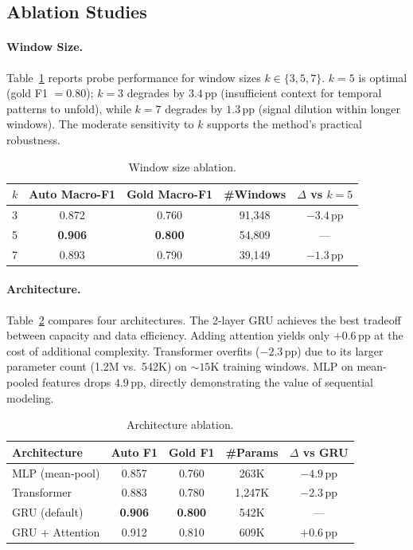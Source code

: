 \documentclass[11pt]{article}
\begin{document}
\subsection{Ablation Studies}
\label{sec:ablations}

\paragraph{Window Size.}
Table~\ref{tab:window_size} reports probe performance for window sizes $k \in \{3, 5, 7\}$.
$k = 5$ is optimal (gold F1 $= 0.80$); $k = 3$ degrades by $3.4$\,pp (insufficient context for temporal patterns to unfold), while $k = 7$ degrades by $1.3$\,pp (signal dilution within longer windows).
The moderate sensitivity to $k$ supports the method's practical robustness.

\begin{table}[t]
\centering
\caption{Window size ablation.}
\label{tab:window_size}
\small
\begin{tabular}{lcccc}
\toprule
$k$ & Auto Macro-F1 & Gold Macro-F1 & \#Windows & $\Delta$ vs $k{=}5$ \\
\midrule
3 & 0.872 & 0.760 & 91,348 & $-3.4$\,pp \\
5 & \textbf{0.906} & \textbf{0.800} & 54,809 & --- \\
7 & 0.893 & 0.790 & 39,149 & $-1.3$\,pp \\
\bottomrule
\end{tabular}
\end{table}

\paragraph{Architecture.}
Table~\ref{tab:architecture} compares four architectures.
The 2-layer GRU achieves the best tradeoff between capacity and data efficiency.
Adding attention yields only $+0.6$\,pp at the cost of additional complexity.
Transformer overfits ($-2.3$\,pp) due to its larger parameter count (1.2M vs.\ 542K) on ${\sim}15$K training windows.
MLP on mean-pooled features drops $4.9$\,pp, directly demonstrating the value of sequential modeling.

\begin{table}[t]
\centering
\caption{Architecture ablation.}
\label{tab:architecture}
\small
\begin{tabular}{lcccc}
\toprule
Architecture & Auto F1 & Gold F1 & \#Params & $\Delta$ vs GRU \\
\midrule
MLP (mean-pool) & 0.857 & 0.760 & 263K & $-4.9$\,pp \\
Transformer & 0.883 & 0.780 & 1,247K & $-2.3$\,pp \\
GRU (default) & \textbf{0.906} & \textbf{0.800} & 542K & --- \\
GRU + Attention & 0.912 & 0.810 & 609K & $+0.6$\,pp \\
\bottomrule
\end{tabular}
\end{table}
\end{document}
